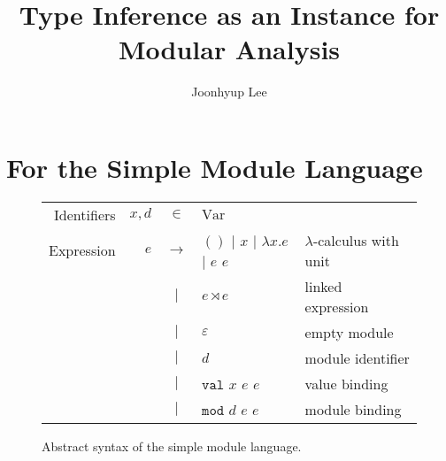 \documentclass{article}
\title{Type Inference as an Instance for Modular Analysis}
\author{Joonhyup Lee}
\theoremstyle{definition}
\newcommand*{\vbar}{|}
\newcommand*{\ExprVar}{\text{Var}}
\newcommand*{\modid}{d}
\newcommand*{\link}[2]{{#1}\rtimes{#2}}
\newcommand*{\Lete}{\mathtt{val}}
\newcommand*{\Letm}{\mathtt{mod}}
\begin{document}
\maketitle
\section{For the Simple Module Language}
\begin{figure}[htb]
  \centering
  \begin{tabular}{rrcll}
    Identifiers & $x,\modid$ & $\in$         & $\ExprVar$                                                                            \\
    Expression  & $e$        & $\rightarrow$ & $()$ $\vbar$ $x$ $\vbar$ $\lambda x.e$ $\vbar$ $e$ $e$ & $\lambda$-calculus with unit \\
                &            & $\vbar$       & $\link{e}{e}$                                          & linked expression            \\
                &            & $\vbar$       & $\varepsilon$                                          & empty module                 \\
                &            & $\vbar$       & $\modid$                                               & module identifier            \\
                &            & $\vbar$       & $\Lete$ $x$ $e$ $e$                                    & value binding                \\
                &            & $\vbar$       & $\Letm$ $\modid$ $e$ $e$                               & module binding               \\
  \end{tabular}
  \caption{Abstract syntax of the simple module language.}
  \label{fig:syntax}
\end{figure}
\end{document}
